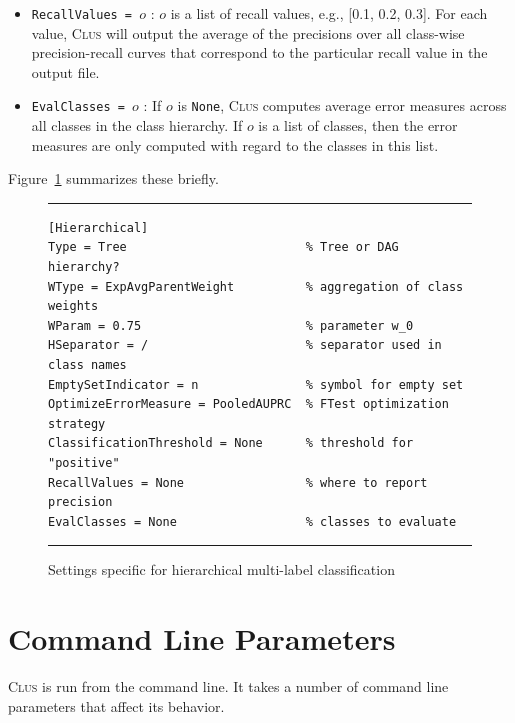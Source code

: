 \documentclass[a4paper]{report}
\newcommand{\clus}{\textsc{Clus}}
\begin{document}
\begin{itemize}
\item {\tt RecallValues = $o$} : $o$ is a list of recall values, e.g., [0.1, 0.2, 0.3]. For each value, \clus{} will output the average of the precisions over all class-wise precision-recall curves that correspond to the particular recall value in the output file.
\item {\tt EvalClasses = $o$} : If $o$ is {\tt None}, \clus{} computes average error measures across all classes in the class  hierarchy. If $o$ is a list of classes, then the error measures are only computed with regard to the classes in this list.
\end{itemize}

Figure~\ref{settings-hmc:fig} summarizes these briefly.

\begin{figure}[tb]
\hrule\vspace{1em}
\begin{verbatim}
[Hierarchical]
Type = Tree                         % Tree or DAG hierarchy?
WType = ExpAvgParentWeight          % aggregation of class weights
WParam = 0.75                       % parameter w_0
HSeparator = /                      % separator used in class names
EmptySetIndicator = n               % symbol for empty set
OptimizeErrorMeasure = PooledAUPRC  % FTest optimization strategy
ClassificationThreshold = None      % threshold for "positive"
RecallValues = None                 % where to report precision
EvalClasses = None                  % classes to evaluate
\end{verbatim}
\hrule
\caption{Settings specific for hierarchical multi-label classification}
\label{settings-hmc:fig}
\end{figure}

\chapter{Command Line Parameters}
\label{param:ch}

\clus{} is run from the command line.  It takes a number of command line parameters that affect its behavior.
\end{document}
